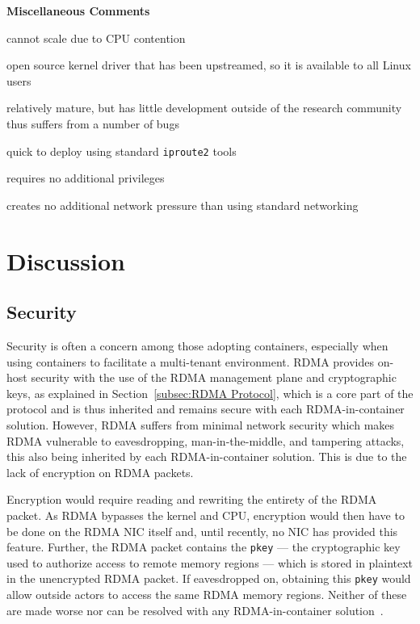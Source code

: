 \documentclass[12pt,titlepage]{article}
\begin{document}
\noindent
\textbf{Miscellaneous Comments}
\begin{description}[nolistsep,font={{\scshape\bfseries}}]
	\item[Scalability Limits] cannot scale due to CPU contention
	\item[Proprietary] open source kernel driver that has been upstreamed, so it is available to all Linux users
	\item[Maturity] relatively mature, but has little development outside of the research community thus suffers from a number of bugs~\cite{softrocedriver}
	\item[Ease in Deployment] quick to deploy using standard \texttt{iproute2} tools
	\item[Execution Privileges] requires no additional privileges
	\item[Network Pressure] creates no additional network pressure than using standard networking
\end{description}

\section{Discussion}
\subsection{Security}
Security is often a concern among those adopting containers, especially when using containers to facilitate a multi-tenant environment.
RDMA provides on-host security with the use of the RDMA management plane and cryptographic keys, as explained in Section~\ref{subsec:RDMA Protocol}, which is a core part of the protocol and is thus inherited and remains secure with each RDMA-in-container solution.
However, RDMA suffers from minimal network security which makes RDMA vulnerable to eavesdropping, man-in-the-middle, and tampering attacks, this also being inherited by each RDMA-in-container solution.
This is due to the lack of encryption on RDMA packets. 

Encryption would require reading and rewriting the entirety of the RDMA packet. 
As RDMA bypasses the kernel and CPU, encryption would then have to be done on the RDMA NIC itself and, until recently, no NIC has provided this feature.
Further, the RDMA packet contains the \texttt{pkey} --- the cryptographic key used to authorize access to remote memory regions --- which is stored in plaintext in the unencrypted RDMA packet.
If eavesdropped on, obtaining this \texttt{pkey} would allow outside actors to access the same RDMA memory regions.
Neither of these are made worse nor can be resolved with any RDMA-in-container solution~\cite{rdmasecurity}.
\end{document}
